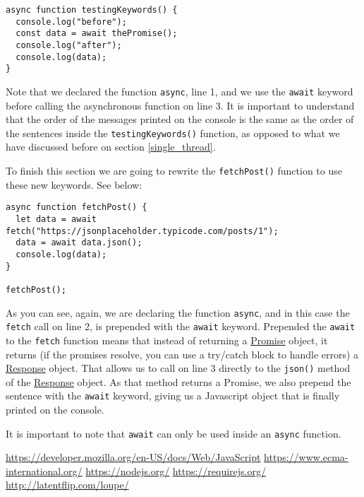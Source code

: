 \documentclass[a4paper, oneside, titlepage, 12pt]{book}
\begin{document}
\begin{verbatim}
async function testingKeywords() {
  console.log("before");
  const data = await thePromise();
  console.log("after");
  console.log(data);
}
\end{verbatim}

Note that we declared the function \texttt{async}, line 1, and we use the \texttt{await} keyword before calling the asynchronous function on line 3. It is important to understand that the order of the messages printed on the console is the same as the order of the sentences inside the \texttt{testingKeywords()} function, as opposed to what we have discussed before on section \ref{single_thread}.
\newline

To finish this section we are going to rewrite the \texttt{fetchPost()} function to use these new keywords. See below:

\begin{verbatim}
async function fetchPost() {
  let data = await fetch("https://jsonplaceholder.typicode.com/posts/1");
  data = await data.json();
  console.log(data);
}

fetchPost();
\end{verbatim}

As you can see, again, we are declaring the function \texttt{async}, and in  this case the \texttt{fetch} call on line 2, is prepended with the \texttt{await} keyword. Prepended the \texttt{await} to the \texttt{fetch} function means that instead of returning a \href{https://developer.mozilla.org/en-US/docs/Web/JavaScript/Reference/Global_Objects/Promise}{Promise} object, it returns (if the promises resolve, you can use a try/catch block to handle errors) a \href{https://developer.mozilla.org/en-US/docs/Web/API/Response}{Response} object. That allows us to call on line 3 directly to the \texttt{json()} method of the \href{https://developer.mozilla.org/en-US/docs/Web/API/Response}{Response} object. As that method returns a Promise, we also prepend the sentence with the \texttt{await} keyword, giving us a Javascript object that is finally printed on the console.
\newline

It is important to note that \texttt{await} can only be used inside an \texttt{async} function.


\begin{thebibliography}{100} %
 \url{https://developer.mozilla.org/en-US/docs/Web/JavaScript}
 \url{https://www.ecma-international.org/}
 \url{https://nodejs.org/}
 \url{https://requirejs.org/}
 \url{http://latentflip.com/loupe/}
\end{thebibliography}
\end{document}
